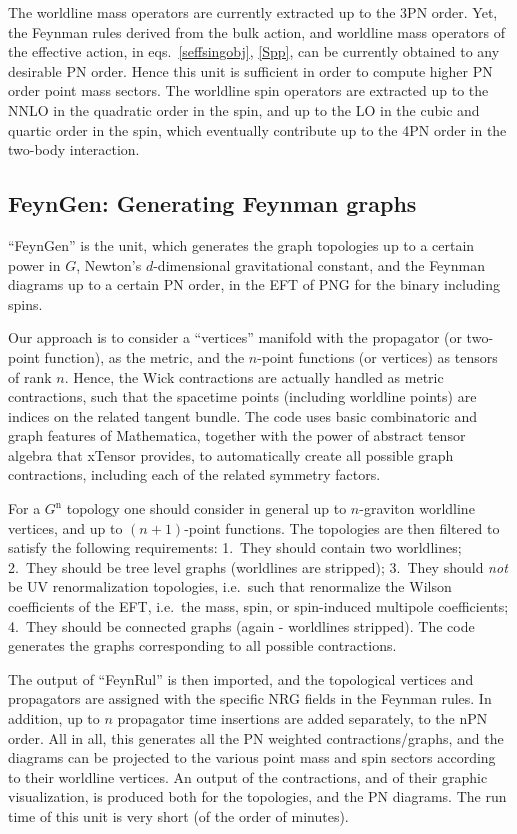 \documentclass[a4paper,11pt]{article}
\begin{document}
The worldline mass operators are currently extracted up to the 3PN order. Yet, the Feynman 
rules derived from the bulk action, and worldline mass operators of the effective action, in 
eqs.~\eqref{seffsingobj}, \eqref{Spp}, can be currently obtained to any desirable PN order. 
Hence this unit is sufficient in order to compute higher PN order point mass sectors. The 
worldline spin operators are extracted up to the NNLO in the quadratic order in the spin, 
and up to the LO in the cubic and quartic order in the spin, which eventually contribute up 
to the 4PN order in the two-body interaction.   


\subsection{FeynGen: Generating Feynman graphs}
\label{feyngen}

``FeynGen'' is the unit, which generates the graph topologies up to a certain power in $G$, 
Newton's $d$-dimensional gravitational constant, and the Feynman diagrams up to a certain PN 
order, in the EFT of PNG for the binary including spins.

Our approach is to consider a ``vertices'' manifold with the propagator (or two-point 
function), as the metric, and the $n$-point functions (or vertices) as tensors of rank $n$. 
Hence, the Wick contractions are actually handled as metric contractions, such that the 
spacetime points (including worldline points) are indices on the related tangent bundle. The 
code uses basic combinatoric and graph features of Mathematica, together with the power of 
abstract tensor algebra that xTensor provides, to automatically create all possible graph 
contractions, including each of the related symmetry factors. 

For a $G^\text{n}$ topology one should consider in general up to $n$-graviton worldline 
vertices, and up to $(n+1)$-point functions. The topologies are then filtered to 
satisfy the following requirements: 1.~They should contain two worldlines; 2.~They should  
be tree level graphs (worldlines are stripped); 3.~They should \textit{not} be UV 
renormalization topologies, i.e.~such that renormalize the Wilson coefficients of the EFT, 
i.e.~the mass, spin, or spin-induced multipole coefficients; 4.~They should be connected 
graphs (again - worldlines stripped). The code generates the graphs corresponding to all 
possible contractions.    

The output of ``FeynRul'' is then imported, and the topological vertices and propagators are 
assigned with the specific NRG fields in the Feynman rules. In addition, up to $n$ 
propagator time insertions are added separately, to the nPN order. All in all, this 
generates all the PN weighted contractions/graphs, and the diagrams can be projected to the 
various point mass and spin sectors according to their worldline vertices. An output of the 
contractions, and of their graphic visualization, is produced both for the topologies, and 
the PN diagrams. The run time of this unit is very short (of the order of minutes). 
\end{document}
